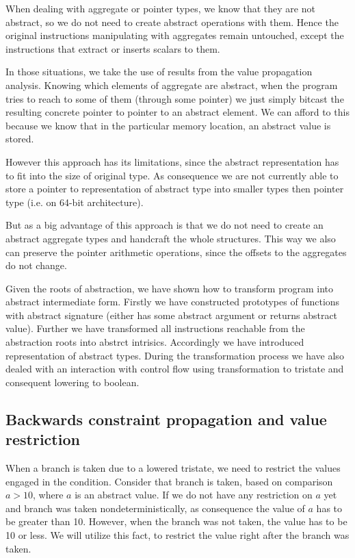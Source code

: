 When dealing with aggregate or pointer types, we know that they are not
abstract, so we do not need to create abstract operations with them. Hence the
original instructions manipulating with aggregates remain untouched, except the
instructions that extract or inserts scalars to them.

In those situations, we take the use of results from the value propagation analysis.
Knowing which elements of aggregate are abstract, when the program tries to
reach to some of them (through some pointer) we just simply bitcast
the resulting concrete pointer to pointer to an abstract element. We can afford
to this because we know that in the particular memory location, an abstract value is
stored.

However this approach has its limitations, since the abstract representation has
to fit into the size of original type. As consequence we are not currently able
to store a pointer to representation of abstract type into smaller types then
pointer type (i.e.  on 64-bit architecture).

But as a big advantage of this approach is that we do not need to create an
abstract aggregate types and handcraft the whole structures. This way we also
can preserve the pointer arithmetic operations, since the offsets to the
aggregates do not change.

\begin{summary}
Given the roots of abstraction, we have shown how to transform program into
abstract intermediate form. Firstly we have constructed prototypes of functions
with abstract signature (either has some abstract argument or returns abstract value).
Further we have transformed all instructions reachable from the abstraction
roots into abstrct intrisics. Accordingly we have introduced representation of
abstract types. During the transformation process we have also dealed with an
interaction with control flow using transformation to tristate and consequent
lowering to \LLVM boolean.
\end{summary}

\subsection{Backwards constraint propagation and value restriction}
\label{sec:bcp}
When a branch is taken due to a lowered tristate, we need to restrict the values
engaged in the condition. Consider that branch is taken, based on comparison $a
> 10$, where $a$ is an abstract value. If we do not have any restriction on $a$
yet and branch was taken nondeterministically, as consequence the value of $a$
has to be greater than 10. However, when the branch was not taken,
the value has to be 10 or less. We will utilize this fact, to restrict the value
right after the branch was taken.

